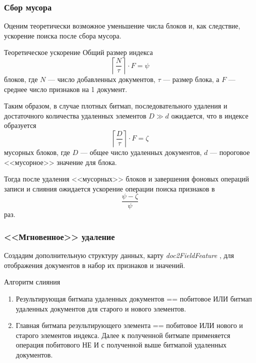 \documentclass[aspectratio=169, pdf, 8pt, unicode]{beamer}
\begin{document}
\begin{frame}[fragile]
\frametitle{Сбор мусора}

Оценим теоретически возможное уменьшение числа блоков и, как следствие, ускорение поиска после сбора мусора.

\begin{block}{Теоретическое ускорение}
    Общий размер индекса
    \begin{equation}
        \left\lceil\frac{N}{\tau}\right\rceil \cdot F = \psi
    \end{equation}
    блоков, где $N$ — число добавленных документов, $\tau$ — размер блока, а
    $F$ — среднее число признаков на 1 документ.

    Таким образом, в случае плотных битмап, последовательного удаления и достаточного количества удаленных элементов $D \gg d$ ожидается, что в индексе образуется
    \begin{equation}
        \left\lceil\frac{D}{\tau}\right\rceil \cdot F = \zeta
    \end{equation}
    мусорных блоков, где $D$ — общее число удаленных документов, $d$ — пороговое <<мусорное>> значение для блока.

    Тогда после удаления <<мусорных>> блоков и завершения фоновых операций
    записи и слияния ожидается ускорение операции поиска признаков в 
    \begin{equation}
        \frac{\psi - \zeta}{\psi}
    \end{equation}
    раз.
\end{block}
\end{frame}

\begin{frame}[fragile]
\frametitle{<<Мгновенное>> удаление}

Создадим дополнительную структуру данных, карту \textit{doc2FieldFeature} , для отображения документов в набор их признаков и значений.

\begin{block}{Алгоритм слияния}
    \begin{enumerate}
        \item Результирующая битмапа удаленных документов == побитовое ИЛИ битмап удаленных документов для старого и нового элементов.
        \item Главная битмапа результирующего элемента == побитовое ИЛИ нового и старого элементов индекса. Далее к полученной битмапе
        применяется операция побитового НЕ И с полученной выше битмапой удаленных документов.
    \end{enumerate}
\end{block}
\end{frame}
\end{document}
